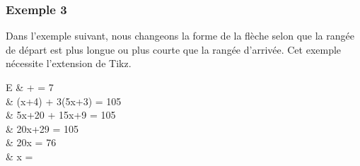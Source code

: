 \documentclass[dvipsnames]{article}%
\begin{document}
\bigskip
\subsubsection{Exemple 3}

Dans l'exemple suivant, nous changeons la forme de la flèche selon que la rangée de départ
est plus longue ou plus courte que la rangée d'arrivée. Cet exemple nécessite l'extension
 de Tikz. 


\begin{Code}
\begin{WithArrows}[ll,interline=5mm,xoffset=5mm,
      \emph{tikz-code  = {\draw[rounded corners,
                          every node/.style = {circle,
                                               draw,
                                               auto = false,
                                               inner sep = 1pt,
                                               fill = gray!50,
                                               font = \tiny }] 
                          let \p1 = (#1),
                              \p2 = (#2)
                          and \ifdim \x1 > \x2
                               (\p1) -- node {#3} (\x1,\y2) -- (\p2)
                             \else
                               (\p1) -- (\x2,\y1) -- node {#3} (\p2)
                             \fi ;}}]
E & \Longleftrightarrow {} +  = 7 
\\
  & (x+4) + 3(5x+3) = 105 \\
  & \Longleftrightarrow 5x+20 + 15x+9 = 105 \\
  & \Longleftrightarrow 20x+29 = 105 
\\
  & \Longleftrightarrow 20x = 76 
\\
  & \Longleftrightarrow x =  
\end{WithArrows}
\end{Code}
\end{document}
